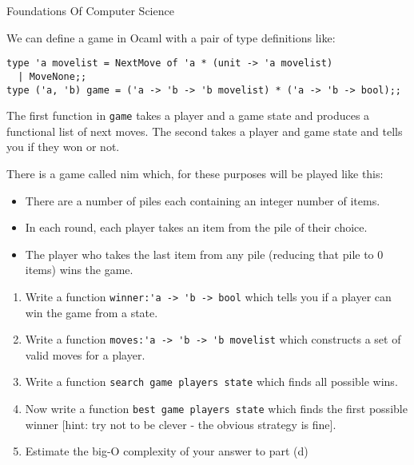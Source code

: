 \documentclass{tripos}
\begin{document}
\begin{question}[MockIA,year=2025,paper=1,question=1,author=rrw]{Foundations Of Computer Science}

We can define a game in Ocaml with a pair of type definitions like:

\begin{verbatim}
type 'a movelist = NextMove of 'a * (unit -> 'a movelist)
  | MoveNone;;
type ('a, 'b) game = ('a -> 'b -> 'b movelist) * ('a -> 'b -> bool);;
\end{verbatim}

The first function in \verb|game| takes a player and a game state and produces a functional list of next moves.
The second takes a player and game state and tells you if they won or not.

There is a game called nim which, for these purposes will be played like this:

\begin{itemize}
\item There are a number of piles each containing an integer number of items.
\item In each round, each player takes an item from the pile of their choice.
\item The player who takes the last item from any pile (reducing that pile to 0 items) wins the game.
\end{itemize}

\begin{enumerate}
\item Write a function \verb|winner:'a -> 'b -> bool| which tells you if a player can win the game from a state. 
\item Write a function \verb|moves:'a -> 'b -> 'b movelist| which constructs a set of valid moves for a player. 
\item Write a function \verb|search game players state| which finds all possible wins. 
\item Now write a function \verb|best game players state| which finds the first possible winner [hint: try not to be clever - the obvious strategy is fine]. 
\item Estimate the big-O complexity of your answer to part (d) 
\end{enumerate}

\eject
\end{question}
\end{document}
